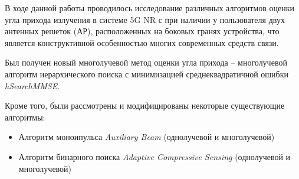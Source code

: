 \Conclusion
В ходе данной работы проводилось исследование различных алгоритмов оценки угла
прихода излучения в системе 5G NR с при наличии у пользователя двух антенных
решеток (АР), расположенных на боковых гранях устройства, что является
конструктивной особенностью многих современных средств связи. 

Был получен новый многолучевой метод оценки угла прихода -- многолучевой
алгоритм иерархического поиска с минимизацией среднеквадратичной ошибки
\textit{hSearchMMSE}.

Кроме того, были рассмотрены и модифицированы некоторые существующие алгоритмы:
\begin{itemize}
    \item Алгоритм моноипульса \textit{Auxiliary Beam} (однолучевой и многолучевой)
    \item Алгоритм бинарного поиска \textit{Adaptive Compressive Sensing} (однолучевой и многолучевой)
\end{itemize}

